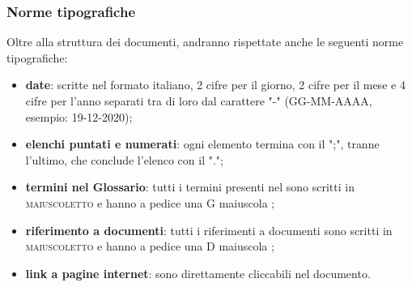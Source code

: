 	\subsubsection{Norme tipografiche}
	Oltre alla struttura dei documenti, andranno rispettate anche le seguenti norme tipografiche:
	\begin{itemize}
		\item \textbf{date}: scritte nel formato italiano, 2 cifre per il giorno, 2 cifre per il mese e 4 cifre per l'anno separati tra di loro dal carattere "-" (GG-MM-AAAA, esempio: 19-12-2020);
		\item \textbf{elenchi puntati e numerati}: ogni elemento termina con il ";", tranne l'ultimo, che conclude l'elenco con il ".";
		\item \textbf{termini nel Glossario}: tutti i termini presenti nel  sono scritti in \textsc{maiuscoletto} e hanno a pedice una G maiuscola \glock{};
		\item \textbf{riferimento a documenti}: tutti i riferimenti a documenti sono scritti in \textsc{maiuscoletto} e hanno a pedice una D maiuscola \dext{};
		\item \textbf{link a pagine internet}: sono direttamente cliccabili nel documento.
	\end{itemize}

